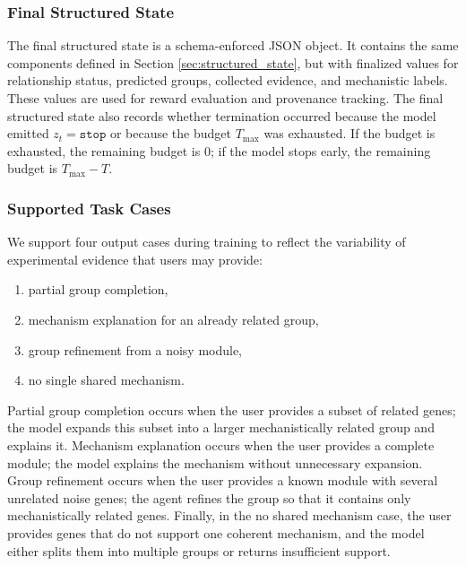 \documentclass[thesis,letterpaper,12pt]{utthesis}
\begin{document}
\subsubsection{Final Structured State}
The final structured state is a schema-enforced JSON object. It contains the same components defined in Section \ref{sec:structured_state}, but with finalized values for relationship status, predicted groups, collected evidence, and mechanistic labels. These values are used for reward evaluation and provenance tracking. The final structured state also records whether termination occurred because the model emitted $z_t = \texttt{stop}$ or because the budget $T_{\max}$ was exhausted. If the budget is exhausted, the remaining budget is $0$; if the model stops early, the remaining budget is $T_{\max} - T$.

\subsubsection{Supported Task Cases}
We support four output cases during training to reflect the variability of experimental evidence that users may provide:
\begin{enumerate}
    \item partial group completion,
    \item mechanism explanation for an already related group,
    \item group refinement from a noisy module,
    \item no single shared mechanism.
\end{enumerate}

Partial group completion occurs when the user provides a subset of related genes; the model expands this subset into a larger mechanistically related group and explains it. Mechanism explanation occurs when the user provides a complete module; the model explains the mechanism without unnecessary expansion. Group refinement occurs when the user provides a known module with several unrelated noise genes; the agent refines the group so that it contains only mechanistically related genes. Finally, in the no shared mechanism case, the user provides genes that do not support one coherent mechanism, and the model either splits them into multiple groups or returns insufficient support.
\end{document}
